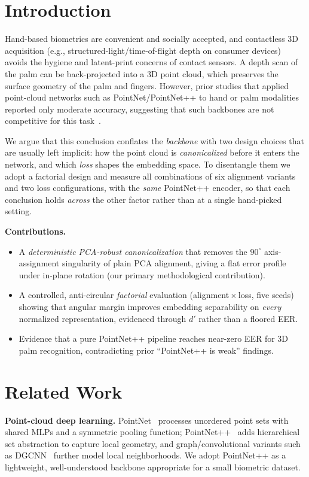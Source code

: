 \documentclass[conference]{IEEEtran}
\begin{document}
\section{Introduction}
Hand-based biometrics are convenient and socially accepted, and contactless 3D
acquisition (e.g., structured-light/time-of-flight depth on consumer devices)
avoids the hygiene and latent-print concerns of contact sensors. A depth scan of
the palm can be back-projected into a 3D point cloud, which preserves the
surface geometry of the palm and fingers. However, prior studies that applied
point-cloud networks such as PointNet/PointNet++ to hand or palm modalities
reported only moderate accuracy, suggesting that such backbones are not
competitive for this task~\cite{svoboda2020palm,zhang2023palm3d}.

We argue that this conclusion conflates the \emph{backbone} with two design
choices that are usually left implicit: how the point cloud is
\emph{canonicalized} before it enters the network, and which \emph{loss} shapes
the embedding space. To disentangle them we adopt a factorial design and measure
all combinations of six alignment variants and two loss configurations, with the
\emph{same} PointNet++ encoder, so that each conclusion holds \emph{across} the
other factor rather than at a single hand-picked setting.

\noindent\textbf{Contributions.}
\begin{itemize}
\item A \emph{deterministic PCA-robust canonicalization} that removes the
$90^{\circ}$ axis-assignment singularity of plain PCA alignment, giving a flat
error profile under in-plane rotation (our primary methodological contribution).
\item A controlled, anti-circular \emph{factorial} evaluation
(alignment\,$\times$\,loss, five seeds) showing that angular margin improves
embedding separability on \emph{every} normalized representation, evidenced
through $d'$ rather than a floored EER.
\item Evidence that a pure PointNet++ pipeline reaches near-zero EER for 3D palm
recognition, contradicting prior ``PointNet++ is weak'' findings.
\end{itemize}

\section{Related Work}
\textbf{Point-cloud deep learning.} PointNet~\cite{qi2017pointnet} processes
unordered point sets with shared MLPs and a symmetric pooling function;
PointNet++~\cite{qi2017pointnetpp} adds hierarchical set abstraction to capture
local geometry, and graph/convolutional variants such as DGCNN~\cite{wang2019dgcnn}
further model local neighborhoods. We adopt PointNet++ as a lightweight,
well-understood backbone appropriate for a small biometric dataset.
\end{document}
